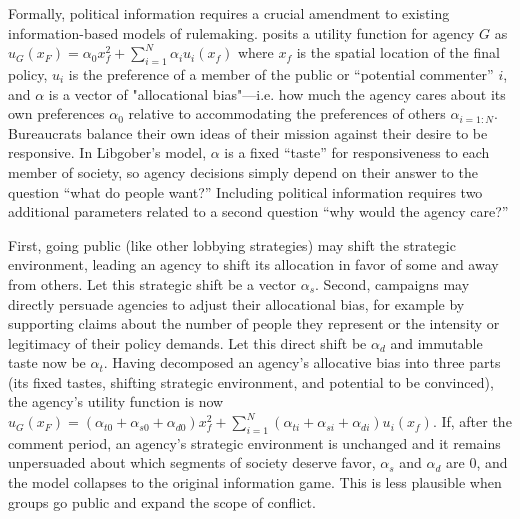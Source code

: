 
Formally, political information requires a crucial amendment to existing information-based models of rulemaking. \citet{Libgober2018} posits a utility function for agency $G$ as $u_G(x_F) = \alpha_0 x_f^2 + \sum_{i=1}^N \alpha_i u_i (x_f)$ where $x_f$ is the spatial location of the final policy, $u_i$ is the preference of a member of the public or ``potential commenter'' $i$, and $\alpha$ is a vector of "allocational bias"---i.e. how much the agency cares about its own preferences $\alpha_0$ relative to accommodating the preferences of others $\alpha_{i=1:N}$. Bureaucrats balance their own ideas of their mission against their desire to be responsive. In Libgober's model, $\alpha$ is a fixed ``taste'' for responsiveness to each member of society, so agency decisions simply depend on their answer to the question ``what do people want?'' Including political information requires two additional parameters related to a second question ``why would the agency care?'' 

First, going public (like other lobbying strategies) may shift the strategic environment, leading an agency to shift its allocation in favor of some and away from others. Let this strategic shift be a vector $\alpha_s$. Second, campaigns may directly persuade agencies to adjust their allocational bias, for example by supporting claims about the number of people they represent or the intensity or legitimacy of their policy demands. Let this direct shift be $\alpha_d$ and immutable taste now be $\alpha_t$. Having decomposed an agency's allocative bias into three parts (its fixed tastes, shifting strategic environment, and potential to be convinced), the agency's utility function is now  $u_G(x_F) =  (\alpha_{t0} + \alpha_{s0} + \alpha_{d0}) x_f^2 + \sum_{i=1}^N (\alpha_{ti} + \alpha_{si} + \alpha_{di}) u_i (x_f)$. If, after the comment period, an agency's strategic environment is unchanged and it remains unpersuaded about which segments of society deserve favor, $\alpha_s$ and $\alpha_d$ are 0, and the model collapses to the original information game. This is less plausible when groups go public and expand the scope of conflict. 

